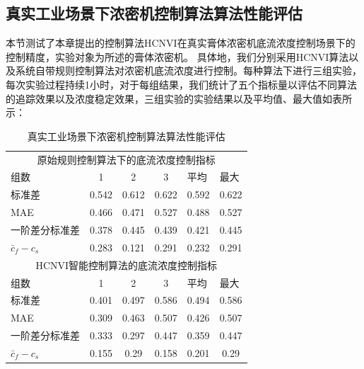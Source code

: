 \subsection{真实工业场景下浓密机控制算法算法性能评估}
本节测试了本章提出的控制算法HCNVI在真实膏体浓密机底流浓度控制场景下的控制精度，实验对象为所述的膏体浓密机。
具体地，我们分别采用HCNVI算法以及系统自带规则控制算法对浓密机底流浓度进行控制。每种算法下进行三组实验，每次实验过程持续1小时，对于每组结果，我们统计了五个指标量以评估不同算法的追踪效果以及浓度稳定效果，三组实验的实验结果以及平均值、最大值如表所示：
\begin{table}[htbp]
  \centering
  \caption{真实工业场景下浓密机控制算法算法性能评估}
    \begin{tabular}{lccccc}
    \toprule
    \multicolumn{6}{c}{原始规则控制算法下的底流浓度控制指标} \\
    \multicolumn{1}{l}{组数} & 1     & 2     & 3     & \multicolumn{1}{l}{平均} & \multicolumn{1}{l}{最大} \\
    \hline
    \multicolumn{1}{l}{标准差} & 0.542 & 0.612 & 0.622 & 0.592 & 0.622 \\
    \multicolumn{1}{l}{MAE} & 0.466 & 0.471 & 0.527 & 0.488 & 0.527 \\
    \multicolumn{1}{l}{一阶差分标准差} & 0.378 & 0.445 & 0.439 & 0.421 & 0.445 \\
    $\bar{c}_{f}-{c}_{s}$   & 0.283 & 0.121 & 0.291 & 0.232 & 0.291 \\
    \midrule
    \multicolumn{6}{c}{HCNVI智能控制算法的底流浓度控制指标} \\
    \multicolumn{1}{l}{组数} & 1     & 2     & 3     & \multicolumn{1}{l}{平均} & \multicolumn{1}{l}{最大} \\
    \hline
    \multicolumn{1}{l}{标准差} & 0.401 & 0.497 & 0.586 & 0.494 & 0.586 \\
    \multicolumn{1}{l}{MAE} & 0.309 & 0.463 & 0.507 & 0.426 & 0.507 \\
    \multicolumn{1}{l}{一阶差分标准差} & 0.333 & 0.297 & 0.447 & 0.359 & 0.447 \\
    $\bar{c}_{f}-{c}_{s}$     & 0.155 & 0.29  & 0.158 & 0.201 & 0.29 \\
    \bottomrule
    \end{tabular}%
  \label{tab:industrial_thickening_eval}%
\end{table}%
